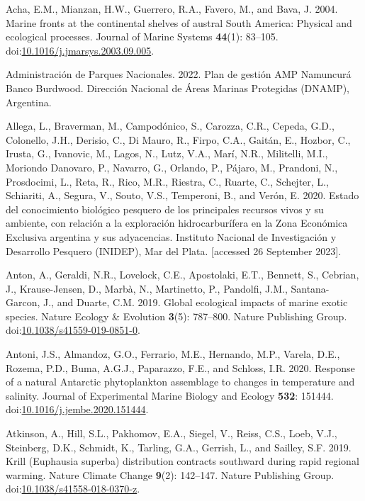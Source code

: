 \documentclass[
]{article}
\newlength{\cslhangindent}
\newenvironment{CSLReferences}[2] %
 {\begin{list}{}{%
  \setlength{\itemindent}{0pt}
  \setlength{\leftmargin}{0pt}
  \setlength{\parsep}{0pt}
  \ifodd #1
   \setlength{\leftmargin}{\cslhangindent}
   \setlength{\itemindent}{-1\cslhangindent}
  \fi
  \setlength{\itemsep}{#2\baselineskip}}}
 {\end{list}}
\begin{document}
\label{refs}
\begin{CSLReferences}{1}{0}
Acha, E.M., Mianzan, H.W., Guerrero, R.A., Favero, M., and Bava, J.
2004. Marine fronts at the continental shelves of austral {South
America}: {Physical} and ecological processes. Journal of Marine Systems
\textbf{44}(1): 83--105.
doi:\href{https://doi.org/10.1016/j.jmarsys.2003.09.005}{10.1016/j.jmarsys.2003.09.005}.

Administración de Parques Nacionales. 2022. {Plan de gesti{ó}n AMP
Namuncur{á} Banco Burdwood}. Direcci{ó}n Nacional de {Á}reas Marinas
Protegidas (DNAMP), Argentina.

Allega, L., Braverman, M., Campodónico, S., Carozza, C.R., Cepeda, G.D.,
Colonello, J.H., Derisio, C., Di Mauro, R., Firpo, C.A., Gaitán, E.,
Hozbor, C., Irusta, G., Ivanovic, M., Lagos, N., Lutz, V.A., Marí, N.R.,
Militelli, M.I., Moriondo Danovaro, P., Navarro, G., Orlando, P.,
Pájaro, M., Prandoni, N., Prosdocimi, L., Reta, R., Rico, M.R., Riestra,
C., Ruarte, C., Schejter, L., Schiariti, A., Segura, V., Souto, V.S.,
Temperoni, B., and Verón, E. 2020. {Estado del conocimiento biol{ó}gico
pesquero de los principales recursos vivos y su ambiente, con relaci{ó}n
a la exploraci{ó}n hidrocarbur{í}fera en la Zona Econ{ó}mica Exclusiva
argentina y sus adyacencias}. Instituto Nacional de Investigaci{ó}n y
Desarrollo Pesquero (INIDEP), Mar del Plata. {[}accessed 26 September
2023{]}.

Anton, A., Geraldi, N.R., Lovelock, C.E., Apostolaki, E.T., Bennett, S.,
Cebrian, J., Krause-Jensen, D., Marbà, N., Martinetto, P., Pandolfi,
J.M., Santana-Garcon, J., and Duarte, C.M. 2019. Global ecological
impacts of marine exotic species. Nature Ecology \& Evolution
\textbf{3}(5): 787--800. Nature Publishing Group.
doi:\href{https://doi.org/10.1038/s41559-019-0851-0}{10.1038/s41559-019-0851-0}.

Antoni, J.S., Almandoz, G.O., Ferrario, M.E., Hernando, M.P., Varela,
D.E., Rozema, P.D., Buma, A.G.J., Paparazzo, F.E., and Schloss, I.R.
2020. Response of a natural {Antarctic} phytoplankton assemblage to
changes in temperature and salinity. Journal of Experimental Marine
Biology and Ecology \textbf{532}: 151444.
doi:\href{https://doi.org/10.1016/j.jembe.2020.151444}{10.1016/j.jembe.2020.151444}.

Atkinson, A., Hill, S.L., Pakhomov, E.A., Siegel, V., Reiss, C.S., Loeb,
V.J., Steinberg, D.K., Schmidt, K., Tarling, G.A., Gerrish, L., and
Sailley, S.F. 2019. Krill ({Euphausia} superba) distribution contracts
southward during rapid regional warming. Nature Climate Change
\textbf{9}(2): 142--147. Nature Publishing Group.
doi:\href{https://doi.org/10.1038/s41558-018-0370-z}{10.1038/s41558-018-0370-z}.


\end{CSLReferences}
\end{document}
